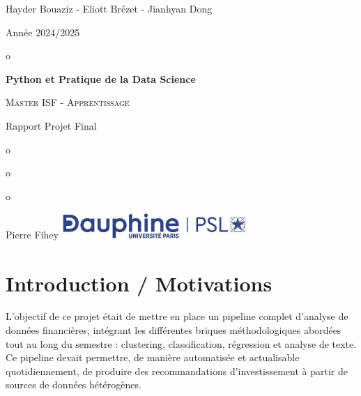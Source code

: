 \documentclass[a4paper,12pt]{article}
\begin{document}
\titleformat{\section}[block]{\normalfont\Large\bfseries}{}{0pt}{}

\begin{titlepage}

	\centering
	

    
    {Hayder Bouaziz - Eliott Brézet - Jianhyan Dong}
    \hfill
	{\large Année 2024/2025 \par}

	
	{\phantom o\par}
	\vspace{3cm}
	{\Huge\bfseries Python et Pratique de la Data Science\par}
	\vspace{0.5cm}
	{\scshape\Large Master ISF - Apprentissage \par}
	{Rapport Projet Final\par}
	\vspace{4cm}
	{\phantom o}
	\vspace{1.5cm}

	{\phantom o}
	
	{{\phantom o}}
	\vspace{1cm}

	\vfill
	
  Pierre Fihey \hfill \includegraphics[width = 70mm]{Dauphine.jpg} 
	
	\vspace{0.4cm}
\end{titlepage}


\thispagestyle{empty}

\fancyfoot[C]{}
\clearpage

\fancyfoot[C]{\thepage}

\tableofcontents

\newpage

\clearpage
\thispagestyle{plain}

\section{Introduction / Motivations}

L’objectif de ce projet était de mettre en place un pipeline complet d’analyse de données financières, intégrant les différentes briques méthodologiques abordées tout au long du semestre : clustering, classification, régression et analyse de texte. Ce pipeline devait permettre, de manière automatisée et actualisable quotidiennement, de produire des recommandations d’investissement à partir de sources de données hétérogènes.
\end{document}
